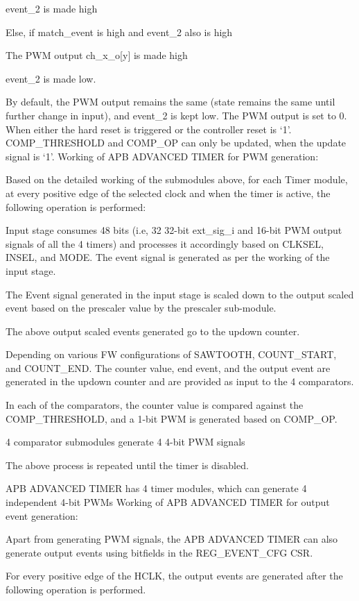                 event_2 is made high

            Else, if match_event is high and event_2 also is high

                The PWM output ch_x_o[y] is made high

                event_2 is made low.

By default, the PWM output remains the same (state remains the same until further change in input), and event_2 is kept low. The PWM output is set to 0. When either the hard reset is triggered or the controller reset is ‘1’. COMP_THRESHOLD and COMP_OP can only be updated, when the update signal is ‘1’.
Working of APB ADVANCED TIMER for PWM generation:

Based on the detailed working of the submodules above, for each Timer module, at every positive edge of the selected clock and when the timer is active, the following operation is performed:

    Input stage consumes 48 bits (i.e, 32 32-bit ext_sig_i and 16-bit PWM output signals of all the 4 timers) and processes it accordingly based on CLKSEL, INSEL, and MODE. The event signal is generated as per the working of the input stage.

    The Event signal generated in the input stage is scaled down to the output scaled event based on the prescaler value by the prescaler sub-module.

    The above output scaled events generated go to the updown counter.

    Depending on various FW configurations of SAWTOOTH, COUNT_START, and COUNT_END. The counter value, end event, and the output event are generated in the updown counter and are provided as input to the 4 comparators.

    In each of the comparators, the counter value is compared against the COMP_THRESHOLD, and a 1-bit PWM is generated based on COMP_OP.

    4 comparator submodules generate 4 4-bit PWM signals

    The above process is repeated until the timer is disabled.

APB ADVANCED TIMER has 4 timer modules, which can generate 4 independent 4-bit PWMs
Working of APB ADVANCED TIMER for output event generation:

Apart from generating PWM signals, the APB ADVANCED TIMER can also generate output events using bitfields in the REG_EVENT_CFG CSR.

For every positive edge of the HCLK, the output events are generated after the following operation is performed.

